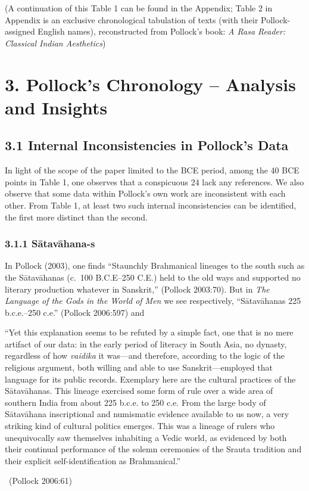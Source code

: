 (A continuation of this Table 1 can be found in the Appendix; Table 2 in Appendix is an exclusive chronological tabulation of texts (with their Pollock-assigned English names), reconstructed from Pollock’s book: \textit{A Rasa Reader: Classical Indian Aesthetics})



\section*{3. Pollock’s Chronology – \hfill\break Analysis and Insights}

\subsection*{3.1 Internal Inconsistencies in Pollock’s Data}

In light of the scope of the paper limited to the BCE period, among the 40 BCE points in Table 1, one observes that a conspicuous 24 lack any references. We also observe that some data within Pollock’s own work are inconsistent with each other. From Table 1, at least two such internal inconsistencies can be identified, the first more distinct than the second.

\subsubsection*{3.1.1 Sātavāhana-s}

In Pollock (2003), one finds “Staunchly Brahmanical lineages to the south such as the Sātavāhanas (c.~100 B.C.E–250 C.E.) held to the old ways and supported no literary production whatever in Sanskrit,” (Pollock 2003:70). But in \textit{The Language of the Gods in the World of Men} we see respectively, “Sātavāhanas 225 b.c.e.–250 c.e.” (Pollock 2006:597) and

\begin{myquote}
“Yet this explanation seems to be refuted by a simple fact, one that is no mere artifact of our data: in the early period of literacy in South Asia, no dynasty, regardless of how \textit{vaidika} it was—and therefore, according to the logic of the religious argument, both willing and able to use Sanskrit—employed that language for its public records. Exemplary here are the cultural practices of the Sātavāhanas. This lineage exercised some form of rule over a wide area of southern India from about 225 b.c.e. to 250 c.e. From the large body of Sātavāhana inscriptional and numismatic evidence available to us now, a very striking kind of cultural politics emerges. This was a lineage of rulers who unequivocally saw themselves inhabiting a Vedic world, as evidenced by both their continual performance of the solemn ceremonies of the Srauta tradition and their explicit self-identification as Brahmanical.” 

~\hfill (Pollock 2006:61)
\end{myquote}

